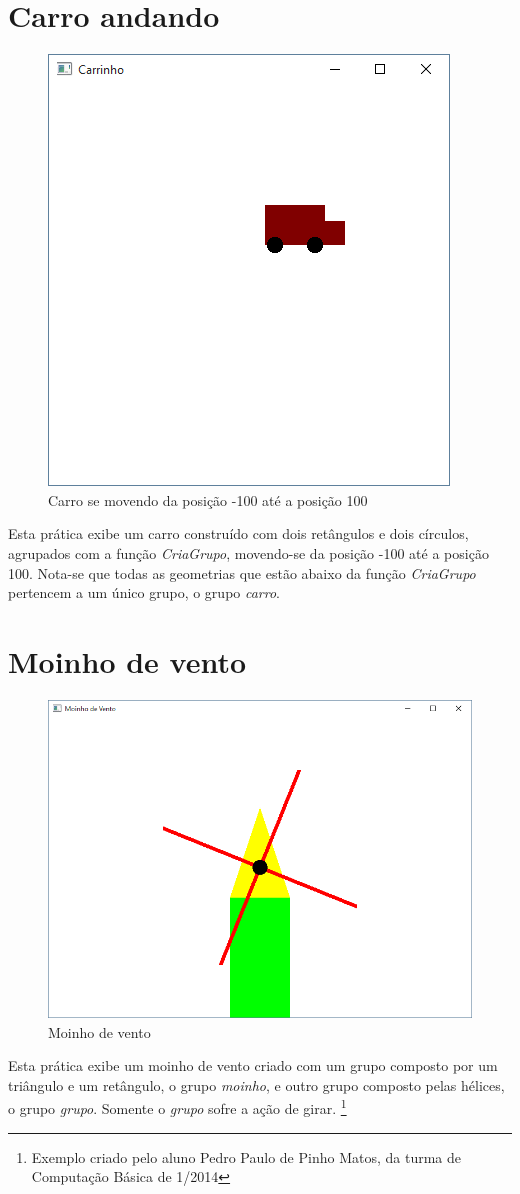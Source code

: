 \section{Carro andando}
\begin{figure}[ht]
  \centerline{\includegraphics[width=.5\textwidth]{img/cap1_ex5.png}}
  \caption{Carro se movendo da posição -100 até a posição 100}
  \label{fig:cap01_ex5}
\end{figure}
Esta prática exibe um carro construído com dois retângulos e dois círculos, agrupados com a função \emph{CriaGrupo}, movendo-se da posição -100 até a posição 100. Nota-se que todas as geometrias que estão abaixo da função \emph{CriaGrupo} pertencem a um único grupo, o grupo \emph{carro}.


\section{Moinho de vento}
\begin{figure}[ht]
  \centerline{\includegraphics[width=.5\textwidth]{img/cap1_ex7.png}}
  \caption{Moinho de vento}
  \label{fig:cap01_ex7}
\end{figure}
Esta prática exibe um moinho de vento criado com um grupo composto por um triângulo e um retângulo, o grupo \emph{moinho}, e outro grupo composto pelas hélices, o grupo \emph{grupo}. Somente o \emph{grupo} sofre a ação de girar. \footnote{Exemplo criado pelo aluno Pedro Paulo de Pinho Matos, da turma de Computação Básica de 1/2014}


